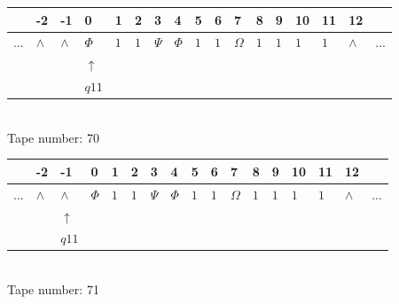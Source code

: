 \documentclass[11pt]{article}
\begin{document}
\begin{table}[H]
\centering
\begin{tabular}{lllllllllllllllll}
 & -2 & -1 & 0 & 1 & 2 & 3 & 4 & 5 & 6 & 7 & 8 & 9 & 10 & 11 & 12 & \\
\hline
$...$ & \multicolumn{1}{|l|}{$\wedge$} & \multicolumn{1}{|l|}{$\wedge$} & \multicolumn{1}{|l|}{$\Phi$} & \multicolumn{1}{|l|}{$1$} & \multicolumn{1}{|l|}{$1$} & \multicolumn{1}{|l|}{$\Psi$} & \multicolumn{1}{|l|}{$\Phi$} & \multicolumn{1}{|l|}{$1$} & \multicolumn{1}{|l|}{$1$} & \multicolumn{1}{|l|}{$\Omega$} & \multicolumn{1}{|l|}{$1$} & \multicolumn{1}{|l|}{$1$} & \multicolumn{1}{|l|}{$1$} & \multicolumn{1}{|l|}{$1$} & \multicolumn{1}{|l|}{$\wedge$} & $...$\\
\hline
&  &  & $\uparrow$ &  &  &  &  &  &  &  &  &  &  &  &  &  \\
&  &  & $ q11 $ &  &  &  &  &  &  &  &  &  &  &  &  &  \\
\end{tabular}
\\
Tape number: 70
\noindent\makebox[\linewidth]{\hdashrule{\textwidth}{1pt}{1pt}}\end{table}

\begin{table}[H]
\centering
\begin{tabular}{lllllllllllllllll}
 & -2 & -1 & 0 & 1 & 2 & 3 & 4 & 5 & 6 & 7 & 8 & 9 & 10 & 11 & 12 & \\
\hline
$...$ & \multicolumn{1}{|l|}{$\wedge$} & \multicolumn{1}{|l|}{$\wedge$} & \multicolumn{1}{|l|}{$\Phi$} & \multicolumn{1}{|l|}{$1$} & \multicolumn{1}{|l|}{$1$} & \multicolumn{1}{|l|}{$\Psi$} & \multicolumn{1}{|l|}{$\Phi$} & \multicolumn{1}{|l|}{$1$} & \multicolumn{1}{|l|}{$1$} & \multicolumn{1}{|l|}{$\Omega$} & \multicolumn{1}{|l|}{$1$} & \multicolumn{1}{|l|}{$1$} & \multicolumn{1}{|l|}{$1$} & \multicolumn{1}{|l|}{$1$} & \multicolumn{1}{|l|}{$\wedge$} & $...$\\
\hline
&  & $\uparrow$ &  &  &  &  &  &  &  &  &  &  &  &  &  &  \\
&  & $ q11 $ &  &  &  &  &  &  &  &  &  &  &  &  &  &  \\
\end{tabular}
\\
Tape number: 71
\noindent\makebox[\linewidth]{\hdashrule{\textwidth}{1pt}{1pt}}\end{table}
\clearpage
\end{document}
